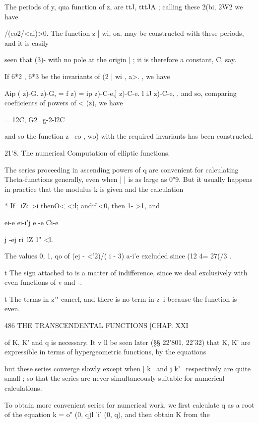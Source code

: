 The periods of y, qua function of z, are ttJ, tttJA ; calling these
2(bi, 2W2 we have

/(co2/<ai)>0. The function z | wi, oa. may be constructed with these
periods, and it is easily

seen that (3)- %
with no pole at the origin | ; it is therefore a constant, C, say.

If 6*2 , 6*3 be the invariants of (2 | wi , a>. , we have

Aip ( z)-G. z)-G, = f z) = ip z)-C-e,] z)-C-e. l iJ z)-C-e, , and so,
comparing coefiicients of powers of < (z), we have

= 12C, G2=g-2-l2C%

and so the function z \ co , wo) with the required invariants has been
constructed.

21'8. The numerical Computation of elliptic functions.

The series proceeding in ascending powers of q are convenient for
calculating Theta-functions generally, even when | | is as large as
0"9. But it usually happens in practice that the modulus k is given
and the calculation

* If \ iZ: >i thenO< <:l; andif <0, then 1- >1, and

ei-e ei-i'j e -e Ci-e

 j -ej ri\ lZ 1" <l.

The values 0, 1, qo of (ej - <'2)/( i - 3) a-i'e excluded since (12 4=
27(/3 .

t The sign attached to is a matter of indifference, since we deal
exclusively with even functions of v and -.

t The terms in z'" cancel, and there is no term in z~i because the
function is even.



486 THE TRANSCENDENTAL FUNCTIONS [CHAP. XXI

of K, K' and q is necessary. It v ll be seen later (§§ 22'801, 22'32)
that K, K' are expressible in terms of hypergeometric functions, by
the equations

but these series converge slowly except when | k \ and j k' \
respectively are quite small ; so that the series are never
simultaneously suitable for numerical calculations.

To obtain more convenient series for numerical work, we first
calculate q as a root of the equation k = o" (0, q)l 'i' (0, q), and
then obtain K from the


